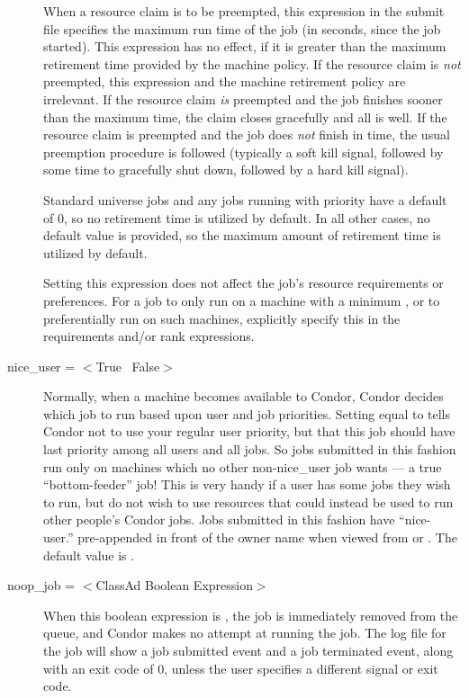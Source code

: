 \begin{description}
When a resource claim is to be preempted, this expression in the
submit file specifies the maximum run time of the job (in seconds, since
the job started).
This expression has no effect,
if it is greater than the maximum retirement time provided
by the machine policy.
If the resource claim is \emph{not} preempted,
this expression and the machine retirement policy are irrelevant. 
If the resource claim \emph{is} preempted
and the job finishes sooner than the maximum time,
the claim closes gracefully and all is well.
If the resource claim is preempted
and the job does \emph{not} finish in time,
the usual preemption
procedure is followed (typically a soft kill signal, followed by some
time to gracefully shut down, followed by a hard kill signal).

Standard universe jobs and any jobs running with 
priority have a default  of 0,
so no retirement time is utilized by default.
In all other cases,
no default value is provided,
so the maximum amount of retirement time is utilized by default.

Setting this expression does not affect the job's resource
requirements or preferences.  
For a job to only run on
a machine with a minimum \AdAttr{},
or to preferentially run on such machines, explicitly
specify this in the requirements and/or rank expressions.


\item[nice\_user = $<$True \Bar\ False$>$] \label{man-condor-submit-nice}Normally, when a machine
becomes available to Condor, Condor decides which job to run based upon
user and job priorities. Setting  equal to 
tells Condor not to use your regular user priority, but that this job
should have last priority among all users and all jobs. So jobs
submitted in this fashion run only on machines which no other
non-nice\_user job wants --- a true ``bottom-feeder'' job! This is very
handy if a user has some jobs they wish to run, but do not wish to use
resources that could instead be used to run other people's Condor jobs. Jobs
submitted in this fashion have ``nice-user.'' pre-appended in front of
the owner name when viewed from  or .  The
default value is .


\item[noop\_job = $<$ClassAd Boolean Expression$>$]
When this boolean expression is ,
the job is immediately removed from the queue,
and Condor makes no attempt at running the job.
The log file for the job will show a
job submitted event and a job terminated event,
along with an exit code of 0,
unless the user specifies a different signal or exit code.


\end{description}
